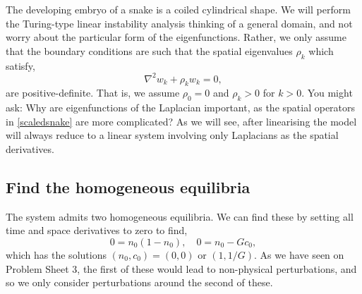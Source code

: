 \documentclass[main.tex]{subfiles}
\begin{document}
The developing embryo of a snake is a coiled cylindrical shape. We will perform the Turing-type linear instability analysis thinking of a general domain, and not worry about the particular form of the eigenfunctions. Rather, we only assume that the boundary conditions are such that the spatial eigenvalues $\rho_k$ which satisfy,
\begin{equation}\label{eigen_snake}
    \nabla^2 w_k + \rho_k w_k = 0,
\end{equation}
are positive-definite. That is, we assume $\rho_0=0$ and $\rho_k>0$ for $k>0$. You might ask: Why are eigenfunctions of the Laplacian important, as the spatial operators in \cref{scaledsnake} are more complicated? As we will see, after linearising the model will always reduce to a linear system involving only Laplacians as the spatial derivatives.

\subsection*{Find the homogeneous equilibria}
The system admits two homogeneous equilibria. We can find these by setting all time and space derivatives to zero to find,
\begin{equation}
    0 = n_0(1-n_0), \quad 0=n_0 - Gc_0,
\end{equation}
which has the solutions $(n_0, c_0) = (0,0)$ or $(1,1/G)$. As we have seen on Problem Sheet 3, the first of these would lead to non-physical perturbations, and so we only consider perturbations around the second of these.
\end{document}
